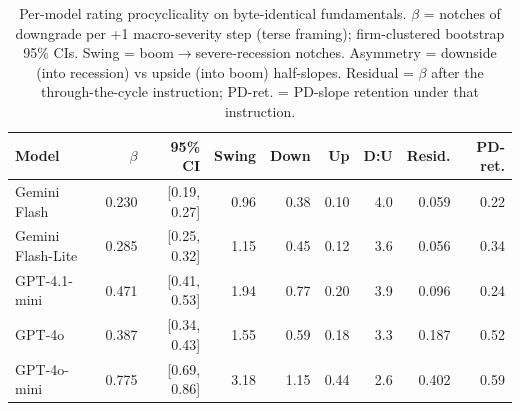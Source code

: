 \begin{table}[t]
\centering
\caption{Per-model rating procyclicality on byte-identical fundamentals. $\beta$ = notches of downgrade per +1 macro-severity step (terse framing); firm-clustered bootstrap 95\% CIs. Swing = boom$\to$severe-recession notches. Asymmetry = downside (into recession) vs upside (into boom) half-slopes. Residual = $\beta$ after the through-the-cycle instruction; PD-ret. = PD-slope retention under that instruction.}
\label{tab:permodel}
\begin{tabular}{lrrrrrrrr}
\toprule
Model & $\beta$ & 95\% CI & Swing & Down & Up & D:U & Resid. & PD-ret. \\
\midrule
Gemini Flash & 0.230 & [0.19, 0.27] & 0.96 & 0.38 & 0.10 & 4.0 & 0.059 & 0.22 \\
Gemini Flash-Lite & 0.285 & [0.25, 0.32] & 1.15 & 0.45 & 0.12 & 3.6 & 0.056 & 0.34 \\
GPT-4.1-mini & 0.471 & [0.41, 0.53] & 1.94 & 0.77 & 0.20 & 3.9 & 0.096 & 0.24 \\
GPT-4o & 0.387 & [0.34, 0.43] & 1.55 & 0.59 & 0.18 & 3.3 & 0.187 & 0.52 \\
GPT-4o-mini & 0.775 & [0.69, 0.86] & 3.18 & 1.15 & 0.44 & 2.6 & 0.402 & 0.59 \\
\bottomrule
\end{tabular}
\end{table}